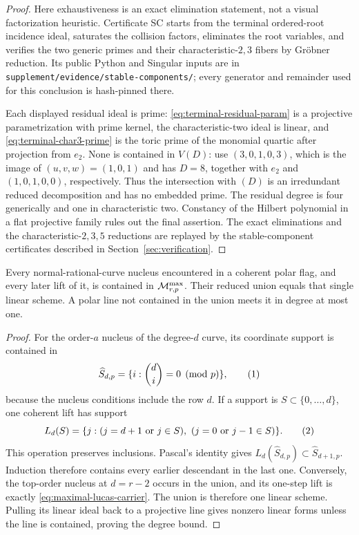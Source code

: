 \begin{proof}
Here exhaustiveness is an exact elimination statement, not a visual
factorization heuristic.  Certificate SC starts from the terminal
ordered-root incidence ideal, saturates the collision factors, eliminates
the root variables, and verifies the two generic primes and their
characteristic-\(2,3\) fibers by Gröbner reduction.  Its public Python and
Singular inputs are in
\texttt{supplement/evidence/stable-components/}; every generator and
remainder used for this conclusion is hash-pinned there.

Each displayed residual ideal is prime:
\eqref{eq:terminal-residual-param} is a projective parametrization with prime
kernel, the characteristic-two ideal is linear, and
\eqref{eq:terminal-char3-prime} is the
toric prime of the monomial quartic after projection from \(e_2\).  None is
contained in \(V(D)\): use \((3,0,1,0,3)\), which is the image of
\((u,v,w)=(1,0,1)\) and has \(D=8\), together with \(e_2\) and
\((1,0,1,0,0)\), respectively.  Thus the intersection with \((D)\) is an
irredundant reduced decomposition and has no embedded prime.  The residual
degree is four generically and one in characteristic two.  Constancy of the
Hilbert polynomial in a flat projective family rules out the final assertion.
The exact eliminations and the characteristic-\(2,3,5\) reductions are
replayed by the stable-component certificates described in
Section~\ref{sec:verification}.
\end{proof}

\begin{proposition}\label{prop:maximal-lucas-union}%
%
Every normal-rational-curve nucleus encountered in a coherent polar flag,
and every later lift of it, is contained in
\(\mathcal M^{\max}_{r,p}\).  Their reduced union equals that single linear
scheme.  A polar line not contained in the union meets it in degree at most
one.
\end{proposition}

\begin{proof}
For the order-\(a\) nucleus of the degree-\(d\) curve, its coordinate support
is contained in
\[
 \widehat S_{d,p}=\{i:\binom di=0\pmod p\},
 \autoeqtag{eq:lucas-zero-support}
\]
because the nucleus conditions include the row \(d\).  If a support is
\(S\subset\{0,\ldots,d\}\), one coherent lift has support
\[
 L_d(S)=\{j:(j=d+1\text{ or }j\in S),\
                 (j=0\text{ or }j-1\in S)\}.
 \autoeqtag{eq:lucas-support-lift}
\]
This operation preserves inclusions.  Pascal's identity gives
\(L_d(\widehat S_{d,p})\subset\widehat S_{d+1,p}\).
Induction therefore contains every earlier descendant in the last one.
Conversely, the top-order nucleus at \(d=r-2\) occurs in the union, and its
one-step lift is exactly \eqref{eq:maximal-lucas-carrier}.  The union is
therefore one linear scheme.  Pulling its linear ideal back to a projective
line gives nonzero linear forms unless the line is contained, proving the
degree bound.
\end{proof}

